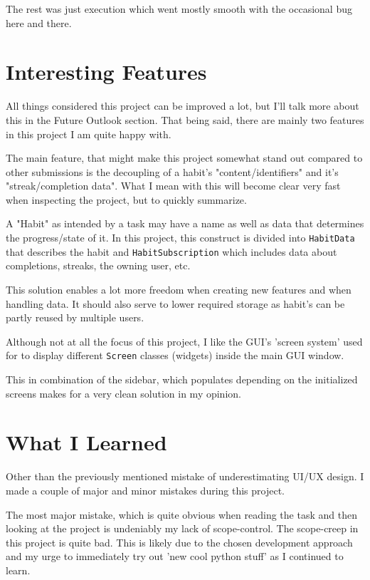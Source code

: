 \documentclass[11pt]{article}
\begin{document}
The rest was just execution which went mostly smooth with the occasional
bug here and there.

\section*{Interesting Features}

All things considered this project can be improved a lot, but I'll talk more
about this in the Future Outlook section. That being said, there are mainly two features in this project I am quite
happy with.

The main feature, that might make this project somewhat stand out compared to other
submissions is the decoupling of a habit's "content/identifiers" and it's "streak/completion data".
What I mean with this will become clear very fast when inspecting the project, but
to quickly summarize.

A "Habit" as intended by a task may have a name as well as data
that determines the progress/state of it. In this project, this construct is divided
into \texttt{HabitData} that describes the habit and \texttt{HabitSubscription}
which includes data about completions, streaks, the owning user, etc.

This solution enables a lot more freedom when creating new features and when handling
data. It should also serve to lower required storage as habit's can be partly reused
by multiple users.

Although not at all the focus of this project, I like the GUI's 'screen system'
used for to display different \texttt{Screen} classes (widgets) inside the main
GUI window.

This in combination of the sidebar, which populates depending on the initialized
screens makes for a very clean solution in my opinion.

\section*{What I Learned}

Other than the previously mentioned mistake of underestimating UI/UX design.
I made a couple of major and minor mistakes during this project.

The most major mistake, which is quite obvious when reading the task and then
looking at the project is undeniably my lack of scope-control. The scope-creep
in this project is quite bad. This is likely due to the chosen development
approach and my urge to immediately try out 'new cool python stuff' as I
continued to learn.
\end{document}
